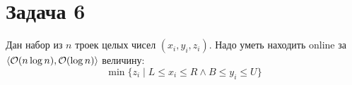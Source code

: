\section{Задача 6}
Дан набор из $n$ троек целых чисел $(x_i, y_i, z_i)$.
Надо уметь находить online за $\langle \mathcal{O}(n \log{n}), \mathcal{O}(\log n) \rangle$ величину:
$$\min \{ z_i \mid L \le x_i \le R \land B \le y_i \le U \}$$
